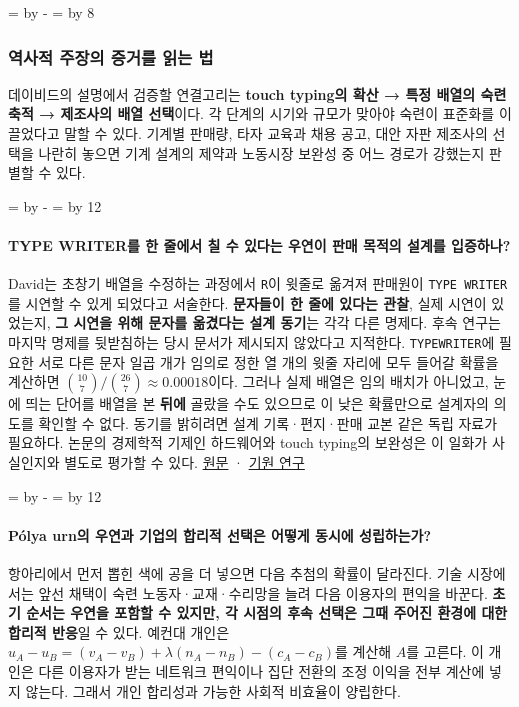 \documentclass[10pt,a4paper]{article}
\newcommand{\ReserveQuestionSpace}{%
  \par\begingroup
  \dimen0=\pagegoal \advance\dimen0 by -\pagetotal
  \dimen2=\baselineskip \multiply\dimen2 by 12
  \ifdim\dimen0<\dimen2 \newpage\fi
  \endgroup}
\newcommand{\ReserveReadingSectionSpace}{%
  \par\begingroup
  \dimen0=\pagegoal \advance\dimen0 by -\pagetotal
  \dimen2=\baselineskip \multiply\dimen2 by 8
  \ifdim\dimen0<\dimen2 \newpage\fi
  \endgroup}
\begin{document}
\ReserveReadingSectionSpace
\subsubsection*{역사적 주장의 증거를 읽는 법}

데이비드의 설명에서 검증할 연결고리는 \textbf{touch typing의 확산 → 특정 배열의 숙련 축적 → 제조사의 배열 선택}이다. 각 단계의 시기와 규모가 맞아야 숙련이 표준화를 이끌었다고 말할 수 있다. 기계별 판매량, 타자 교육과 채용 공고, 대안 자판 제조사의 선택을 나란히 놓으면 기계 설계의 제약과 노동시장 보완성 중 어느 경로가 강했는지 판별할 수 있다.\par

\ReserveQuestionSpace
\paragraph{TYPE WRITER를 한 줄에서 칠 수 있다는 우연이 판매 목적의 설계를 입증하나?}
David는 초창기 배열을 수정하는 과정에서 \texttt{R}이 윗줄로 옮겨져 판매원이 \texttt{TYPE WRITER}를 시연할 수 있게 되었다고 서술한다. \textbf{문자들이 한 줄에 있다는 관찰}, 실제 시연이 있었는지, \textbf{그 시연을 위해 문자를 옮겼다는 설계 동기}는 각각 다른 명제다. 후속 연구는 마지막 명제를 뒷받침하는 당시 문서가 제시되지 않았다고 지적한다. \texttt{TYPEWRITER}에 필요한 서로 다른 문자 일곱 개가 임의로 정한 열 개의 윗줄 자리에 모두 들어갈 확률을 계산하면 $\binom{10}{7}/\binom{26}{7}\approx0.00018$이다. 그러나 실제 배열은 임의 배치가 아니었고, 눈에 띄는 단어를 배열을 본 \textbf{뒤에} 골랐을 수도 있으므로 이 낮은 확률만으로 설계자의 의도를 확인할 수 없다. 동기를 밝히려면 설계 기록·편지·판매 교본 같은 독립 자료가 필요하다. 논문의 경제학적 기제인 하드웨어와 touch typing의 보완성은 이 일화가 사실인지와 별도로 평가할 수 있다. \href{https://www.jstor.org/stable/1805621}{원문} · \href{https://strathprints.strath.ac.uk/67983/}{기원 연구}\par

\ReserveQuestionSpace
\paragraph{Pólya urn의 우연과 기업의 합리적 선택은 어떻게 동시에 성립하는가?}
항아리에서 먼저 뽑힌 색에 공을 더 넣으면 다음 추첨의 확률이 달라진다. 기술 시장에서는 앞선 채택이 숙련 노동자·교재·수리망을 늘려 다음 이용자의 편익을 바꾼다. \textbf{초기 순서는 우연을 포함할 수 있지만, 각 시점의 후속 선택은 그때 주어진 환경에 대한 합리적 반응}일 수 있다. 예컨대 개인은 $u_A-u_B=(v_A-v_B)+\lambda(n_A-n_B)-(c_A-c_B)$를 계산해 $A$를 고른다. 이 개인은 다른 이용자가 받는 네트워크 편익이나 집단 전환의 조정 이익을 전부 계산에 넣지 않는다. 그래서 개인 합리성과 가능한 사회적 비효율이 양립한다.\par
\end{document}
